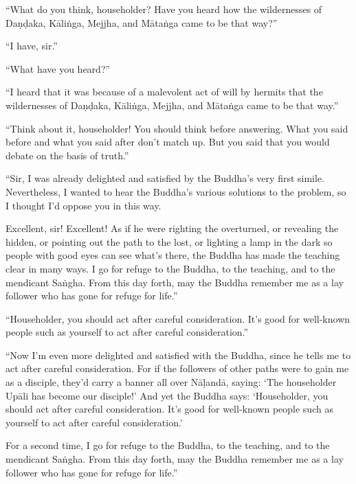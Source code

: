 \documentclass[12pt,openany]{book}%
\begin{document}
“What do you think, householder? Have you heard how the wildernesses of \textsanskrit{Daṇḍaka}, \textsanskrit{Kāliṅga}, Mejjha, and \textsanskrit{Mātaṅga} came to be that way?” 

“I have, sir.” 

“What have you heard?” 

“I heard that it was because of a malevolent act of will by hermits that the wildernesses of \textsanskrit{Daṇḍaka}, \textsanskrit{Kāliṅga}, Mejjha, and \textsanskrit{Mātaṅga} came to be that way.” 

“Think about it, householder! You should think before answering. What you said before and what you said after don’t match up. But you said that you would debate on the basis of truth.” 

“Sir, I was already delighted and satisfied by the Buddha’s very first simile. Nevertheless, I wanted to hear the Buddha’s various solutions to the problem, so I thought I’d oppose you in this way. 

Excellent, sir! Excellent! As if he were righting the overturned, or revealing the hidden, or pointing out the path to the lost, or lighting a lamp in the dark so people with good eyes can see what’s there, the Buddha has made the teaching clear in many ways. I go for refuge to the Buddha, to the teaching, and to the mendicant \textsanskrit{Saṅgha}. From this day forth, may the Buddha remember me as a lay follower who has gone for refuge for life.” 

“Householder, you should act after careful consideration. It’s good for well-known people such as yourself to act after careful consideration.” 

“Now I’m even more delighted and satisfied with the Buddha, since he tells me to act after careful consideration. For if the followers of other paths were to gain me as a disciple, they’d carry a banner all over \textsanskrit{Nāḷandā}, saying: ‘The householder \textsanskrit{Upāli} has become our disciple!’ And yet the Buddha says: ‘Householder, you should act after careful consideration. It’s good for well-known people such as yourself to act after careful consideration.’ 

For a second time, I go for refuge to the Buddha, to the teaching, and to the mendicant \textsanskrit{Saṅgha}. From this day forth, may the Buddha remember me as a lay follower who has gone for refuge for life.” 
\end{document}
